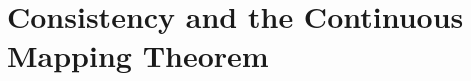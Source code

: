 \documentclass[12pt, block=fill]{beamer}
\begin{document}
  
  
  
  

\section{Consistency and the Continuous Mapping Theorem}
\end{document}
